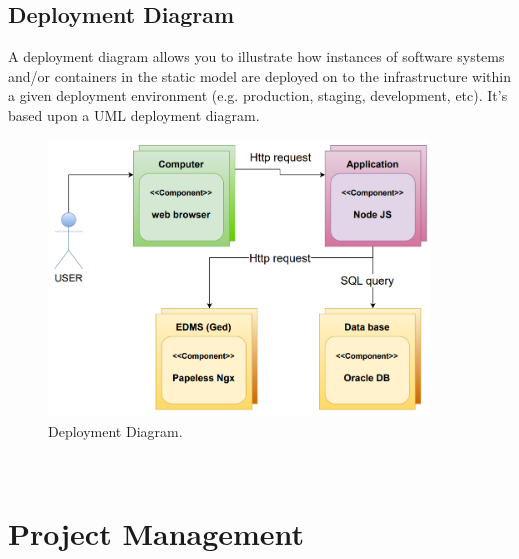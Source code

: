 \subsection{Deployment Diagram}
A deployment diagram allows you to illustrate how instances of software systems and/or containers in the static model are deployed on to the infrastructure within a given deployment environment (e.g. production, staging, development, etc). It’s based upon a UML deployment diagram.\cite{samplewebs30}
\begin{figure}[h]
    \centering
    \includegraphics[width=0.9\textwidth]{figures/diagram de deploiement.png} 
    \caption{Deployment Diagram.}
\end{figure}\
\section{Project Management}
